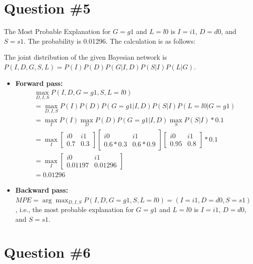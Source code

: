 \documentclass[conference]{styles/acmsiggraph}
\begin{document}
\section{Question \#5}
The Most Probable Explanation for $G=g1$ and $L=l0$ is $I=i1$, $D=d0$, and $S=s1$. The probability is 0.01296. The calculation is as follows:

The joint distribution of the given Bayesian network is $P(I,D,G,S,L) = P(I) P(D) P(G|I,D) P(S|I) P(L|G)$.
\begin{itemize}[leftmargin=*]
	\setlength{\itemsep}{0pt}
	\setlength{\parsep}{0pt}
	\setlength{\parskip}{0pt}
	\item \textbf{Forward pass:}
\begin{equation}
	\begin{aligned}
		& \max_{D,I,S} P(I,D,G=g1,S,L=l0)\\
		&= \max_{D,I,S} P(I)P(D)P(G=g1|I, D)P(S|I)P(L=l0|G=g1)\\
		&= \max_{I} P(I) \max_D P(D)P(G=g1|I, D) \max_S P(S|I) * 0.1 \\
		&= \max_{I} \left[ \begin{array}{cc}
			i0 & i1\\
			0.7 & 0.3
			\end{array}\right] 
			\left[ \begin{array}{cc}
			i0 & i1\\
			0.6*0.3 & 0.6*0.9
			\end{array}\right] 
			\left[ \begin{array}{cc}
			i0 & i1\\
			0.95 & 0.8
			\end{array}\right]* 0.1 \\
		&= \max_{I} \left[ \begin{array}{cc}
			i0 & i1\\
			0.01197 & 0.01296
			\end{array}\right] \\
		& = 0.01296 
	\end{aligned}
\end{equation}
	\item \textbf{Backward pass:} $MPE = \arg\max_{D,I,S} P(I,D,G=g1,S,L=l0) = (I=i1, D=d0, S=s1)$, i.e., the most probable explanation for $G=g1$ and $L=l0$ is $I=i1$, $D=d0$, and $S=s1$.
\end{itemize}

\section{Question \#6}
\end{document}
